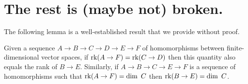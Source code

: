 \section{The rest is (maybe not) broken.}

The following lemma is a well-established result that we provide without proof.

\begin{lemma}\label{lem:sandwich}
    Given a sequence $A\to B\to C\to D\to E\to F$ of homomorphisms between finite-dimensional vector spaces, if $\mathrm{rk}(A\to F) = \mathrm{rk}(C\to D)$ then this quantity also equals the rank of $B\to E$.
    Similarly, if $A\to B\to C\to E\to F$ is a sequence of homomorphisms such that $\mathrm{rk}(A\to F) = \dim~C$ then $\mathrm{rk}(B\to E) = \dim~C$.
\end{lemma}


